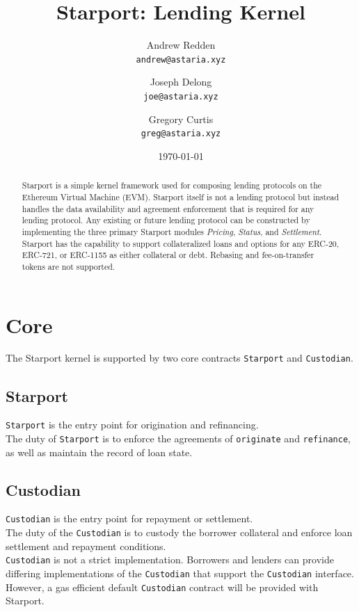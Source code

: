 \documentclass[12pt]{article}
\title{Starport: Lending Kernel}
\author{Andrew Redden \\ \texttt{andrew@astaria.xyz}
        \and
        Joseph Delong \\ \texttt{joe@astaria.xyz}
        \and
        Gregory Curtis \\ \texttt{greg@astaria.xyz}}
\date{\today}
\begin{document}
\maketitle

\begin{abstract}
Starport is a simple kernel framework used for composing lending protocols on the Ethereum Virtual Machine (EVM).
Starport itself is not a lending protocol but instead handles the data availability and agreement enforcement that is required for any lending protocol.
Any existing or future lending protocol can be constructed by implementing the three primary Starport modules \emph{Pricing}, \emph{Status}, and \emph{Settlement}.\\

Starport has the capability to support collateralized loans and options for any ERC-20\cite{erc20}, ERC-721\cite{erc721}, or ERC-1155\cite{erc1155} as either collateral or debt. Rebasing and fee-on-transfer tokens are not supported.
\end{abstract}

\section{Core}
The Starport kernel is supported by two core contracts \texttt{Starport} and \texttt{Custodian}.
\subsection{Starport}

\texttt{Starport} is the entry point for origination and refinancing.\\

The duty of \texttt{Starport} is to enforce the agreements of \texttt{originate} and \texttt{refinance}, as well as maintain the record of loan state.

\subsection{Custodian}

\texttt{Custodian} is the entry point for repayment or settlement.\\

The duty of the \texttt{Custodian} is to custody the borrower collateral and enforce loan settlement and repayment conditions.\\

\texttt{Custodian} is not a strict implementation. Borrowers and lenders can provide differing implementations of the \texttt{Custodian} that support the \texttt{Custodian} interface. However, a gas efficient default \texttt{Custodian} contract will be provided with Starport.
\end{document}
